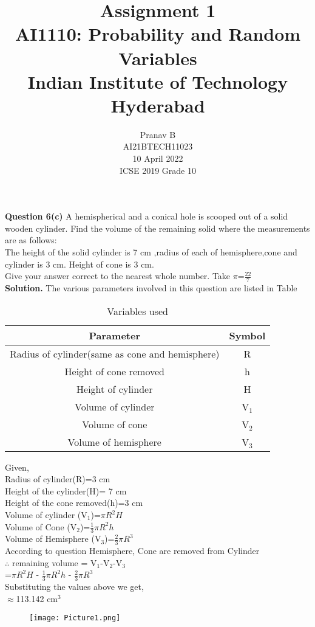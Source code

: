 \documentclass[journal,12pt,twocolumn]{IEEEtran}
\title{Assignment 1 \\ \Large AI1110: Probability and Random Variables \\ \large Indian Institute of Technology Hyderabad}
\author{Pranav B \\ \normalsize AI21BTECH11023 \\ \vspace*{20pt} \normalsize  10 April 2022 \\ \vspace*{20pt} \Large ICSE 2019 Grade 10}
\begin{document}
	\maketitle
	
	\textbf{Question 6(c)} 
	A hemispherical and a conical hole is scooped out of a solid wooden cylinder. Find the volume of the remaining solid where the measurements are as follows:\\
	The height of the solid cylinder is 7 cm ,radius of each of hemisphere,cone and cylinder is 3 cm. Height of cone is 3 cm.\\
	Give your answer correct to the nearest whole number. Take $\pi$=$\frac{22}{7}$\\
	\textbf{Solution.}
	The various parameters involved in this question are listed in Table \begin{table}[h]
\caption{Variables used}
\begin{tabular}{|c|c|}
\hline
Parameter & Symbol\\
\hline
Radius of cylinder(same as cone and hemisphere) & R\\
\hline
Height of cone removed & h \\
\hline
Height of cylinder & H  \\
\hline
Volume of cylinder & V$_1$ \\
\hline
Volume of cone  & V$_2$\\
\hline
Volume of hemisphere & V$_3$\\
\hline
\end{tabular}
\end{table}
	
	Given,\\
Radius of cylinder(R)=3 cm\\
Height of the cylinder(H)= 7 cm\\
Height of the cone removed(h)=3 cm\\
Volume of cylinder (V$_1$)=$\pi R^2 H$\\
Volume of Cone (V$_2$)=$\frac{1}{3} \pi R^2 h$\\
Volume of Hemisphere (V$_3$)=$\frac{2}{3} \pi R^3$\\
According to question Hemisphere, Cone are removed from Cylinder\\
$\therefore$ remaining volume = V$_1$-V$_2$-V$_3$\\
=$\pi R^2 H$ - $\frac{1}{3} \pi R^2 h$ - $\frac{2}{3} \pi R^3$\\
Substituting the values above we get,\\
$\approx$113.142 cm$^3$	
\begin{figure}[h]
\texttt{[image: Picture1.png]}

\end{figure}
			
\end{document}
